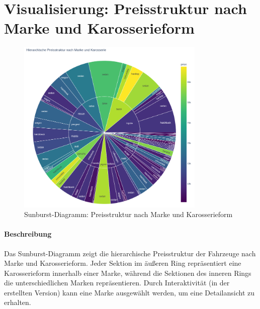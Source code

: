 \documentclass[a4paper,12pt]{article}
\begin{document}
\section{Visualisierung: Preisstruktur nach Marke und Karosserieform}
\begin{figure}[H]
    \centering
    \includegraphics[width=0.8\textwidth]{../images/preisstruktur_nach_marke_karosserie.png} %
    \caption{Sunburst-Diagramm: Preisstruktur nach Marke und Karosserieform}
    \label{fig:vis3}
\end{figure}


\paragraph{Beschreibung}
Das Sunburst-Diagramm zeigt die hierarchische Preisstruktur der Fahrzeuge nach Marke und Karosserieform.
Jeder Sektion im äußeren Ring repräsentiert eine Karosserieform innerhalb einer Marke, während die Sektionen des inneren Rings die unterschiedlichen Marken repräsentieren.
Durch Interaktivität (in der erstellten Version) kann eine Marke ausgewählt werden, um eine Detailansicht zu erhalten.
\end{document}
